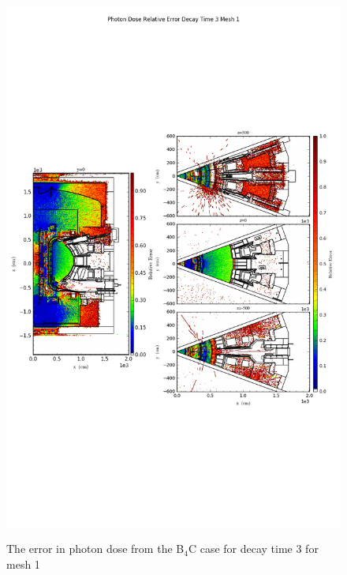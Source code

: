 \begin{figure}[ht!]
\centering
\includegraphics[trim={0cm 9cm 0cm 10cm},clip,scale=0.75]{../plots/final_model_nob4c/Photon_Dose_Relative_Error_Decay_Time_3_Mesh_1.png}
\label{fig:photons_dc3_no4bc_m1_error}
\caption{The error in photon dose from the B$_4$C case for decay time 3 for mesh 1}
\end{figure}
